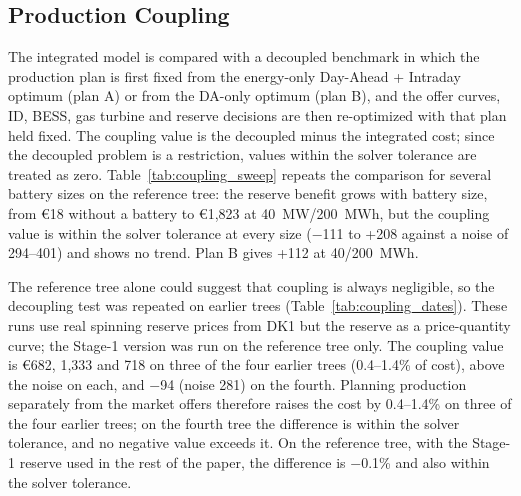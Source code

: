 \documentclass[5p,times,twocolumn]{elsarticle}
\begin{document}
\subsection{Production Coupling}
\label{sec:coupling}
The integrated model is compared with a decoupled benchmark in which the production plan is first fixed from the energy-only Day-Ahead + Intraday optimum (plan A) or from the DA-only optimum (plan B), and the offer curves, ID, BESS, gas turbine and reserve decisions are then re-optimized with that plan held fixed. The coupling value is the decoupled minus the integrated cost; since the decoupled problem is a restriction, values within the solver tolerance are treated as zero. Table~\ref{tab:coupling_sweep} repeats the comparison for several battery sizes on the reference tree: the reserve benefit grows with battery size, from \euro 18 without a battery to \euro 1,823 at 40~MW/200~MWh, but the coupling value is within the solver tolerance at every size ($-$111 to +208 against a noise of 294--401) and shows no trend. Plan B gives +112 at 40/200~MWh.

\begin{table}[t]
\caption{Reserve benefit and production-coupling value versus battery size (EUR, reference tree, Stage-1 reserve, plan A).}
\label{tab:coupling_sweep}
\centering
\scriptsize
\setlength{\tabcolsep}{2.5pt}
\end{table}

The reference tree alone could suggest that coupling is always negligible, so the decoupling test was repeated on earlier trees (Table~\ref{tab:coupling_dates}). These runs use real spinning reserve prices from DK1 but the reserve as a price-quantity curve; the Stage-1 version was run on the reference tree only. The coupling value is \euro 682, 1,333 and 718 on three of the four earlier trees (0.4--1.4\% of cost), above the noise on each, and $-$94 (noise 281) on the fourth. Planning production separately from the market offers therefore raises the cost by 0.4--1.4\% on three of the four earlier trees; on the fourth tree the difference is within the solver tolerance, and no negative value exceeds it. On the reference tree, with the Stage-1 reserve used in the rest of the paper, the difference is $-$0.1\% and also within the solver tolerance.
\end{document}
